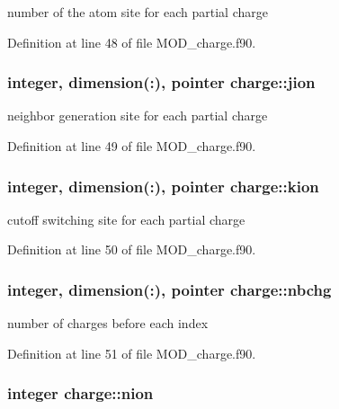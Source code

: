 number of the atom site for each partial charge 



Definition at line 48 of file M\-O\-D\-\_\-charge.\-f90.

\hypertarget{classcharge_a9b1fceb97f6b88a76a894859d0f50b96}{
\subsubsection[{jion}]{\setlength{\rightskip}{0pt plus 5cm}integer, dimension(\-:), pointer charge\-::jion}}\label{classcharge_a9b1fceb97f6b88a76a894859d0f50b96}


neighbor generation site for each partial charge 



Definition at line 49 of file M\-O\-D\-\_\-charge.\-f90.

\hypertarget{classcharge_a62a899e430e111e31269a1768dd2a31c}{
\subsubsection[{kion}]{\setlength{\rightskip}{0pt plus 5cm}integer, dimension(\-:), pointer charge\-::kion}}\label{classcharge_a62a899e430e111e31269a1768dd2a31c}


cutoff switching site for each partial charge 



Definition at line 50 of file M\-O\-D\-\_\-charge.\-f90.

\hypertarget{classcharge_ab1c421b1f72e702793c941110a7d7bb0}{
\subsubsection[{nbchg}]{\setlength{\rightskip}{0pt plus 5cm}integer, dimension(\-:), pointer charge\-::nbchg}}\label{classcharge_ab1c421b1f72e702793c941110a7d7bb0}


number of charges before each index 



Definition at line 51 of file M\-O\-D\-\_\-charge.\-f90.

\hypertarget{classcharge_aa31b8a0b3ed9d9e9598e20aedd38296f}{
\subsubsection[{nion}]{\setlength{\rightskip}{0pt plus 5cm}integer charge\-::nion}}\label{classcharge_aa31b8a0b3ed9d9e9598e20aedd38296f}


